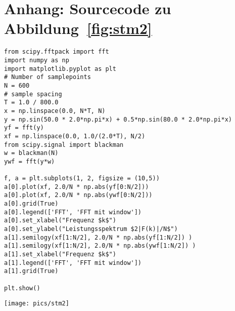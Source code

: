 \section{Anhang: Sourcecode zu Abbildung~\ref{fig:stm2}}
\begin{verbatim}
from scipy.fftpack import fft
import numpy as np
import matplotlib.pyplot as plt
# Number of samplepoints
N = 600
# sample spacing
T = 1.0 / 800.0
x = np.linspace(0.0, N*T, N)
y = np.sin(50.0 * 2.0*np.pi*x) + 0.5*np.sin(80.0 * 2.0*np.pi*x)
yf = fft(y)
xf = np.linspace(0.0, 1.0/(2.0*T), N/2)
from scipy.signal import blackman
w = blackman(N)
ywf = fft(y*w)

f, a = plt.subplots(1, 2, figsize = (10,5))
a[0].plot(xf, 2.0/N * np.abs(yf[0:N/2]))
a[0].plot(xf, 2.0/N * np.abs(ywf[0:N/2]))
a[0].grid(True)
a[0].legend(['FFT', 'FFT mit window'])
a[0].set_xlabel("Frequenz $k$")
a[0].set_ylabel("Leistungsspektrum $2|F(k)|/N$")
a[1].semilogy(xf[1:N/2], 2.0/N * np.abs(yf[1:N/2]) )
a[1].semilogy(xf[1:N/2], 2.0/N * np.abs(ywf[1:N/2]) )
a[1].set_xlabel("Frequenz $k$")
a[1].legend(['FFT', 'FFT mit window'])
a[1].grid(True)

plt.show()
\end{verbatim}
\texttt{[image: pics/stm2]}

